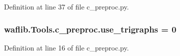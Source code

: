 Definition at line 37 of file c\+\_\+preproc.\+py.

\subsubsection[{\texorpdfstring{use\+\_\+trigraphs}{use_trigraphs}}]{ waflib.\+Tools.\+c\+\_\+preproc.\+use\+\_\+trigraphs = 0}\hypertarget{namespacewaflib_1_1_tools_1_1c__preproc_a09286f77860a605ca825531218d9b651}{}\label{namespacewaflib_1_1_tools_1_1c__preproc_a09286f77860a605ca825531218d9b651}


Definition at line 16 of file c\+\_\+preproc.\+py.

